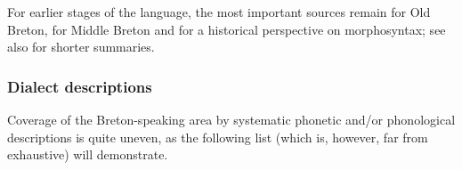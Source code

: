 For earlier stages of the language, the most important sources remain \citet{fleuriot64:_le} for Old Breton, \citet{LlydawegCanol} for Middle Breton and \citet{hemon75:_breton} for a historical perspective on morphosyntax; see also \citet{schrijver11:_middl_early_moder_breton,schrijver11:_old_britis} for shorter summaries.

\subsubsection{Dialect descriptions}
\label{sec:dialect-descriptions}

Coverage of the Breton-speaking area by systematic phonetic and/or phonological descriptions is quite uneven, as the following list (which is, however, far from exhaustive) will demonstrate.

